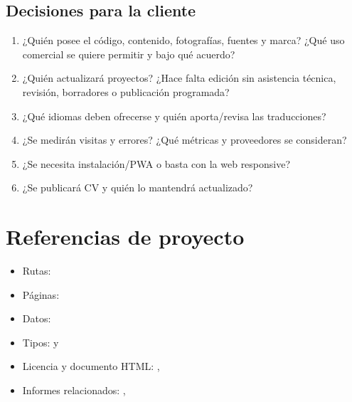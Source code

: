 \documentclass[11pt,a4paper]{report}
\begin{document}
\begin{center}
\end{center}

\section{Decisiones para la cliente}

\begin{enumerate}
  \item ¿Quién posee el código, contenido, fotografías, fuentes y marca? ¿Qué uso comercial se quiere permitir y bajo qué acuerdo?
  \item ¿Quién actualizará proyectos? ¿Hace falta edición sin asistencia técnica, revisión, borradores o publicación programada?
  \item ¿Qué idiomas deben ofrecerse y quién aporta/revisa las traducciones?
  \item ¿Se medirán visitas y errores? ¿Qué métricas y proveedores se consideran?
  \item ¿Se necesita instalación/PWA o basta con la web responsive?
  \item ¿Se publicará CV y quién lo mantendrá actualizado?
\end{enumerate}

\chapter{Referencias de proyecto}

\begin{itemize}
  \item Rutas: 
  \item Páginas: 
  \item Datos: 
  \item Tipos:  y 
  \item Licencia y documento HTML: , 
  \item Informes relacionados: , 
\end{itemize}
\end{document}
